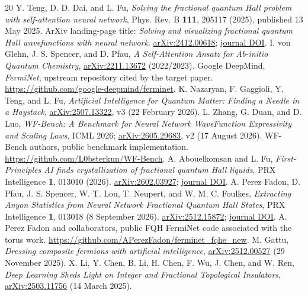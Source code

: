 \documentclass[11pt,letterpaper]{article}
\begin{document}
\begin{thebibliography}{20}
 Y. Teng, D. D. Dai, and L. Fu, \emph{Solving the fractional quantum Hall problem with self-attention neural network}, Phys. Rev. B \textbf{111}, 205117 (2025), published 13 May 2025. ArXiv landing-page title: \emph{Solving and visualizing fractional quantum Hall wavefunctions with neural network}. \href{https://arxiv.org/abs/2412.00618}{arXiv:2412.00618}; \href{https://doi.org/10.1103/PhysRevB.111.205117}{journal DOI}.
 I. von Glehn, J. S. Spencer, and D. Pfau, \emph{A Self-Attention Ansatz for Ab-initio Quantum Chemistry}, \href{https://arxiv.org/abs/2211.13672}{arXiv:2211.13672} (2022/2023).
 Google DeepMind, \emph{FermiNet}, upstream repository cited by the target paper. \url{https://github.com/google-deepmind/ferminet}.
 K. Nazaryan, F. Gaggioli, Y. Teng, and L. Fu, \emph{Artificial Intelligence for Quantum Matter: Finding a Needle in a Haystack}, \href{https://arxiv.org/abs/2507.13322}{arXiv:2507.13322}, v3 (22 February 2026).
 L. Zhang, G. Duan, and D. Luo, \emph{WF-Bench: A Benchmark for Neural Network WaveFunction Expressivity and Scaling Laws}, ICML 2026; \href{https://arxiv.org/abs/2605.29683}{arXiv:2605.29683}, v2 (17 August 2026).
 WF-Bench authors, public benchmark implementation. \url{https://github.com/L0bsterkun/WF-Bench}.
 A. Abouelkomsan and L. Fu, \emph{First-Principles AI finds crystallization of fractional quantum Hall liquids}, PRX Intelligence \textbf{1}, 013010 (2026). \href{https://arxiv.org/abs/2602.03927}{arXiv:2602.03927}; \href{https://doi.org/10.1103/9qlr-jp6x}{journal DOI}.
 A. Perez Fadon, D. Pfau, J. S. Spencer, W. T. Lou, T. Neupert, and W. M. C. Foulkes, \emph{Extracting Anyon Statistics from Neural Network Fractional Quantum Hall States}, PRX Intelligence \textbf{1}, 013018 (8 September 2026). \href{https://arxiv.org/abs/2512.15872}{arXiv:2512.15872}; \href{https://doi.org/10.1103/sb8g-qvn6}{journal DOI}.
 A. Perez Fadon and collaborators, public FQH FermiNet code associated with the torus work. \url{https://github.com/APerezFadon/ferminet_fqhe_new}.
 M. Gattu, \emph{Dressing composite fermions with artificial intelligence}, \href{https://arxiv.org/abs/2512.00527}{arXiv:2512.00527} (29 November 2025).
 X. Li, Y. Chen, B. Li, H. Chen, F. Wu, J. Chen, and W. Ren, \emph{Deep Learning Sheds Light on Integer and Fractional Topological Insulators}, \href{https://arxiv.org/abs/2503.11756}{arXiv:2503.11756} (14 March 2025).

\end{thebibliography}
\end{document}
